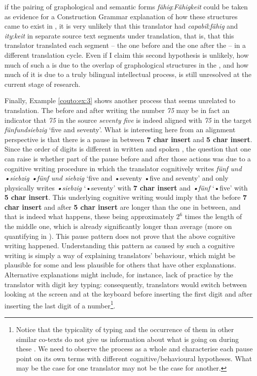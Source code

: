 \documentclass[output=paper]{LSP/langsci}
\begin{document}
if the pairing of graphological and semantic forms \emph{fähig}:\emph{Fähigkeit} could be taken as evidence for a Construction Grammar explanation of how these structures came to exist in , it is very unlikely that this translator had \emph{capabil}:\emph{fähig} and \emph{ity}:\emph{keit} in separate source text segments under translation, that is, that this translator translated each segment -- the one before and the one after the  -- in a different translation cycle. Even if I claim this second hypothesis is unlikely, how much of such a 
 is due to the overlap of graphological structures in the , and how much of it is due to a truly bilingual intellectual process, is still unresolved at the current stage of research.

\largerpage[-2]
Finally, Example \ref{couto:ex:3} shows another process that seems unrelated to translation. The  before and after writing the number \emph{75} may be in fact an indicator that \emph{75} in the source  \emph{seventy five} is indeed aligned with \emph{75} in the target  \emph{fünfundsiebzig} `five and seventy'. What is interesting here from an alignment perspective is that there is a pause in between \textbf{7 char insert} and \textbf{5 char insert}. Since the order of digits is different in written and spoken , the question that one can raise is whether part of the pause before and after those actions was due to a cognitive writing procedure in which the translator cognitively writes \emph{fünf und •siebzig •fünf und siebzig} `five and •seventy •five and seventy' and only physically writes \emph{•siebzig} `•seventy' with \textbf{7 char insert} and \emph{•fünf} `•five' with \textbf{5 char insert}. This underlying cognitive writing would imply that the  before \textbf{7 char insert} and after \textbf{5 char insert} are longer than the one in between, and that is indeed what happens, these  being approximately $2^6$ times the length of the middle one, which is already significantly longer than average (more on quantifying  in ). This pause pattern does not prove that the above cognitive writing happened. Understanding this pattern as caused by such a cognitive writing is simply a way of explaining translators' behaviour, which might be plausible for some and less plausible for others that have other explanations. Alternative explanations might include, for instance, lack of practice by the translator with digit key typing: consequently, translators would switch between looking at the screen and at the keyboard before inserting the first digit and after inserting the last digit of a number\footnote{Notice that the typicality of typing  and the occurrence of them in other similar co-texts do not give us information about what is going on during these . We need to observe the process as a whole and characterise each pause point on its own terms with different cognitive/behavioural hypotheses. What may be the case for one translator may not be the case for another.}.
\end{document}
